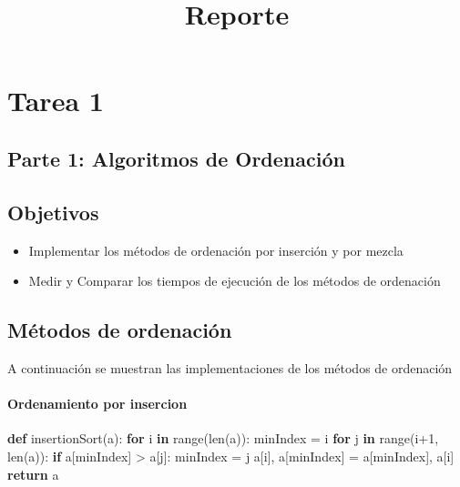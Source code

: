 \documentclass[11pt]{article}
\title{Reporte}
\providecommand{\tightlist}{%
      \setlength{\itemsep}{0pt}\setlength{\parskip}{0pt}}
\newenvironment{Shaded}{}{}
\newcommand{\KeywordTok}[1]{\textcolor[rgb]{0.00,0.44,0.13}{\textbf{{#1}}}}
\newcommand{\DecValTok}[1]{\textcolor[rgb]{0.25,0.63,0.44}{{#1}}}
\newcommand{\NormalTok}[1]{{#1}}
\newcommand{\ControlFlowTok}[1]{\textcolor[rgb]{0.00,0.44,0.13}{\textbf{{#1}}}}
\newcommand{\OperatorTok}[1]{\textcolor[rgb]{0.40,0.40,0.40}{{#1}}}
\newcommand{\BuiltInTok}[1]{{#1}}
\begin{document}
    
    
    \maketitle
    
    

    
    \section{Tarea 1}\label{tarea-1}

    \subsection{Parte 1: Algoritmos de
Ordenación}\label{parte-1-algoritmos-de-ordenaciuxf3n}

    \subsection{Objetivos}\label{objetivos}

\begin{itemize}
\tightlist
\item
  Implementar los métodos de ordenación por inserción y por mezcla
\item
  Medir y Comparar los tiempos de ejecución de los métodos de ordenación
\end{itemize}

    \subsection{Métodos de ordenación}\label{muxe9todos-de-ordenaciuxf3n}

A continuación se muestran las implementaciones de los métodos de
ordenación

\paragraph{Ordenamiento por insercion}\label{ordenamiento-por-insercion}

\begin{Shaded}
\begin{Highlighting}[]
\KeywordTok{def}\NormalTok{ insertionSort(a):}
    \ControlFlowTok{for}\NormalTok{ i }\KeywordTok{in} \BuiltInTok{range}\NormalTok{(}\BuiltInTok{len}\NormalTok{(a)):}
\NormalTok{        minIndex }\OperatorTok{=}\NormalTok{ i}
        \ControlFlowTok{for}\NormalTok{ j }\KeywordTok{in} \BuiltInTok{range}\NormalTok{(i}\OperatorTok{+}\DecValTok{1}\NormalTok{, }\BuiltInTok{len}\NormalTok{(a)):}
            \ControlFlowTok{if}\NormalTok{ a[minIndex] }\OperatorTok{>}\NormalTok{ a[j]:}
\NormalTok{                minIndex }\OperatorTok{=}\NormalTok{ j}
\NormalTok{        a[i], a[minIndex] }\OperatorTok{=}\NormalTok{ a[minIndex], a[i]}
    \ControlFlowTok{return}\NormalTok{ a}
\end{Highlighting}
\end{Shaded}
\end{document}
